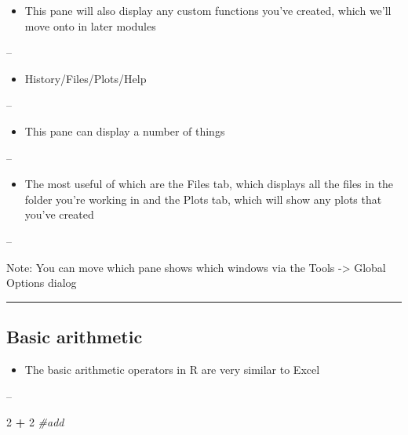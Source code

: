 \documentclass[]{article}
\newenvironment{Shaded}{\begin{snugshade}}{\end{snugshade}}
\newcommand{\CommentTok}[1]{\textcolor[rgb]{0.56,0.35,0.01}{\textit{#1}}}
\newcommand{\DecValTok}[1]{\textcolor[rgb]{0.00,0.00,0.81}{#1}}
\newcommand{\OperatorTok}[1]{\textcolor[rgb]{0.81,0.36,0.00}{\textbf{#1}}}
\newcommand{\StringTok}[1]{\textcolor[rgb]{0.31,0.60,0.02}{#1}}
\providecommand{\tightlist}{%
  \setlength{\itemsep}{0pt}\setlength{\parskip}{0pt}}
\begin{document}
\begin{itemize}
\tightlist
\item
  This pane will also display any custom functions you've created, which
  we'll move onto in later modules
\end{itemize}

--

\begin{itemize}
\tightlist
\item
  History/Files/Plots/Help
\end{itemize}

--

\begin{itemize}
\tightlist
\item
  This pane can display a number of things
\end{itemize}

--

\begin{itemize}
\tightlist
\item
  The most useful of which are the Files tab, which displays all the
  files in the folder you're working in and the Plots tab, which will
  show any plots that you've created
\end{itemize}

--

Note: You can move which pane shows which windows via the Tools
-\textgreater{} Global Options dialog

\begin{center}\rule{0.5\linewidth}{\linethickness}\end{center}

\hypertarget{basic-arithmetic}{%
\subsection{Basic arithmetic}\label{basic-arithmetic}}

\begin{itemize}
\tightlist
\item
  The basic arithmetic operators in R are very similar to Excel
\end{itemize}

--

\begin{Shaded}
\begin{Highlighting}[]
\DecValTok{2} \OperatorTok{+}\StringTok{ }\DecValTok{2} \CommentTok{#add}
\end{Highlighting}
\end{Shaded}
\end{document}
